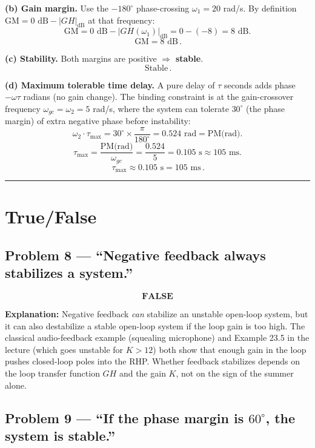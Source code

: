 \documentclass[11pt]{article}
\newcommand{\boxedeq}[1]{\boxed{\,#1\,}}
\begin{document}
\textbf{(b) Gain margin.} Use the $-180^\circ$ phase-crossing $\omega_1 = 20$ rad/s.
By definition $\text{GM} = 0\text{ dB}-|GH|_{\text{dB}}$ at that frequency:
\[
\text{GM} = 0\text{ dB} - |GH(\omega_1)|_{\text{dB}} = 0-(-8) = 8\text{ dB}.
\]
\[
\boxedeq{\text{GM} = 8\text{ dB}}.
\]

\textbf{(c) Stability.} Both margins are positive $\Longrightarrow$ \textbf{stable}.
\[
\boxedeq{\text{Stable}}.
\]

\textbf{(d) Maximum tolerable time delay.} A pure delay of $\tau$ seconds adds phase $-\omega\tau$ radians
(no gain change). The binding constraint is at the gain-crossover frequency $\omega_{gc} = \omega_2 = 5$ rad/s,
where the system can tolerate $30^\circ$ (the phase margin) of extra negative phase before instability:
\[
\omega_2\cdot\tau_{\max} = 30^\circ\times\frac{\pi}{180^\circ} = 0.524\text{ rad} = \text{PM(rad)}.
\]
\[
\tau_{\max} = \frac{\text{PM(rad)}}{\omega_{gc}} = \frac{0.524}{5} = 0.105\text{ s} \approx 105\text{ ms}.
\]
\[
\boxedeq{\tau_{\max} \approx 0.105\text{ s} = 105\text{ ms}}.
\]

\bigskip\hrule\bigskip

\section*{True/False}

\subsection*{Problem 8 --- ``Negative feedback always stabilizes a system.''}

\[
\boxedeq{\textbf{FALSE}}
\]

\textbf{Explanation:} Negative feedback \emph{can} stabilize an unstable open-loop system, but it can also
destabilize a stable open-loop system if the loop gain is too high. The classical audio-feedback example
(squealing microphone) and Example 23.5 in the lecture (which goes unstable for $K>12$) both show that
enough gain in the loop pushes closed-loop poles into the RHP. Whether feedback stabilizes depends on the
loop transfer function $GH$ and the gain $K$, not on the sign of the summer alone.

\subsection*{Problem 9 --- ``If the phase margin is $60^\circ$, the system is stable.''}
\end{document}
